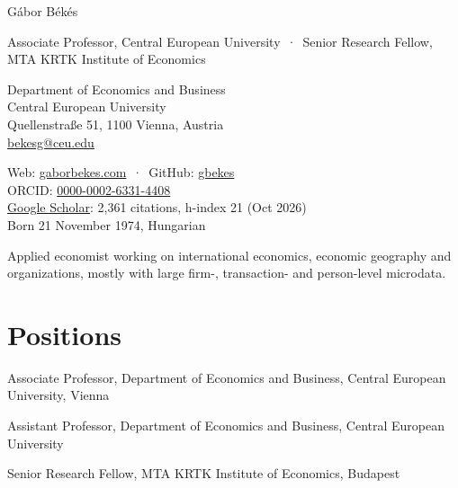 \documentclass[10pt,a4paper]{article}
\begin{document}
{\fontsize{22}{26}\selectfont\color{accent} Gábor Békés}\par
\vspace{0.6ex}
{\color{muted}Associate Professor, Central European University \,·\, Senior Research Fellow, MTA KRTK Institute of Economics}\par
\vspace{1.2ex}
\begin{minipage}[t]{0.52\textwidth}
\small
Department of Economics and Business\\
Central European University\\
Quellenstraße 51, 1100 Vienna, Austria\\
\href{mailto:bekesg@ceu.edu}{bekesg@ceu.edu}
\end{minipage}%
\begin{minipage}[t]{0.48\textwidth}
\small
Web: \href{https://gaborbekes.com}{gaborbekes.com} \,·\, GitHub: \href{https://github.com/gbekes}{gbekes}\\
ORCID: \href{https://orcid.org/0000-0002-6331-4408}{0000-0002-6331-4408}\\
\href{https://scholar.google.com/citations?user=Yk5xy7EAAAAJ}{Google Scholar}: 2,361 citations, h-index 21 (Oct 2026)\\
Born 21 November 1974, Hungarian
\end{minipage}

\vspace{1.2ex}
{\small Applied economist working on international economics, economic geography and organizations,
mostly with large firm-, transaction- and person-level microdata.}

\section{Positions}
\begin{cvlist}
  \item[2023--] Associate Professor, Department of Economics and Business, Central European University, Vienna
  \item[2017--2023] Assistant Professor, Department of Economics and Business, Central European University
  \item[2005--] Senior Research Fellow, MTA KRTK Institute of Economics, Budapest
\end{cvlist}
\end{document}
